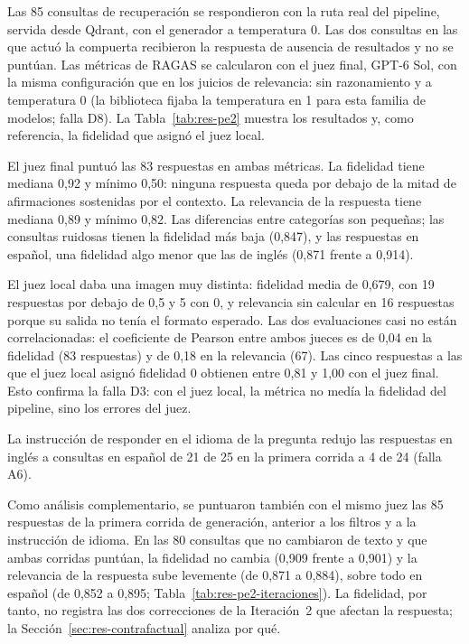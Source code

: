 Las 85 consultas de recuperación se respondieron con la ruta real del pipeline, servida desde Qdrant, con el generador a temperatura 0. Las dos consultas en las que actuó la compuerta recibieron la respuesta de ausencia de resultados y no se puntúan. Las métricas de RAGAS se calcularon con el juez final, GPT-6 Sol, con la misma configuración que en los juicios de relevancia: sin razonamiento y a temperatura 0 (la biblioteca fijaba la temperatura en 1 para esta familia de modelos; falla D8). La Tabla~\ref{tab:res-pe2} muestra los resultados y, como referencia, la fidelidad que asignó el juez local.



El juez final puntuó las 83 respuestas en ambas métricas. La fidelidad tiene mediana 0,92 y mínimo 0,50: ninguna respuesta queda por debajo de la mitad de afirmaciones sostenidas por el contexto. La relevancia de la respuesta tiene mediana 0,89 y mínimo 0,82. Las diferencias entre categorías son pequeñas; las consultas ruidosas tienen la fidelidad más baja (0,847), y las respuestas en español, una fidelidad algo menor que las de inglés (0,871 frente a 0,914).

El juez local daba una imagen muy distinta: fidelidad media de 0,679, con 19 respuestas por debajo de 0,5 y 5 con 0, y relevancia sin calcular en 16 respuestas porque su salida no tenía el formato esperado. Las dos evaluaciones casi no están correlacionadas: el coeficiente de Pearson entre ambos jueces es de 0,04 en la fidelidad (83 respuestas) y de 0,18 en la relevancia (67). Las cinco respuestas a las que el juez local asignó fidelidad 0 obtienen entre 0,81 y 1,00 con el juez final. Esto confirma la falla D3: con el juez local, la métrica no medía la fidelidad del pipeline, sino los errores del juez.

La instrucción de responder en el idioma de la pregunta redujo las respuestas en inglés a consultas en español de 21 de 25 en la primera corrida a 4 de 24 (falla A6).

Como análisis complementario, se puntuaron también con el mismo juez las 85 respuestas de la primera corrida de generación, anterior a los filtros y a la instrucción de idioma. En las 80 consultas que no cambiaron de texto y que ambas corridas puntúan, la fidelidad no cambia (0,909 frente a 0,901) y la relevancia de la respuesta sube levemente (de 0,871 a 0,884), sobre todo en español (de 0,852 a 0,895; Tabla~\ref{tab:res-pe2-iteraciones}). La fidelidad, por tanto, no registra las dos correcciones de la Iteración~2 que afectan la respuesta; la Sección~\ref{sec:res-contrafactual} analiza por qué.


